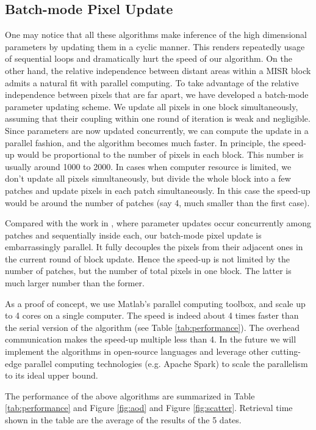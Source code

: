 \subsection{Batch-mode Pixel Update}
One may notice that all these algorithms make inference of the high dimensional parameters by updating them in a cyclic manner. This renders repeatedly usage of sequential loops and dramatically hurt the speed of our algorithm. On the other hand, the relative independence between distant areas within a MISR block admits a natural fit with parallel computing. To take advantage of the relative independence between pixels that are far apart, we have developed a batch-mode parameter updating scheme. We update all pixels in one block simultaneously, assuming that their coupling within one round of iteration is weak and negligible. Since parameters are now updated concurrently, we can compute the update in a parallel fashion, and the algorithm becomes much faster. In principle, the speed-up would be proportional to the number of pixels in each block. This number is usually around 1000 to 2000. In cases when computer resource is limited, we don't update all pixels simultaneously, but divide the whole block into a few patches and update pixels in each patch simultaneously. In this case the speed-up would be around the number of patches (say 4, much smaller than the first case).

Compared with the work in \cite{nancy_paper}, where parameter updates occur concurrently among patches and sequentially inside each, our batch-mode pixel update is embarrassingly parallel. It fully decouples the pixels from their adjacent ones in the current round of block update. Hence the speed-up is not limited by the number of patches, but the number of total pixels in one block. The latter is much larger number than the former.

As a proof of concept, we use Matlab's parallel computing toolbox, and scale up to 4 cores on a single computer. The speed is indeed about 4 times faster than the serial version of the algorithm (see Table \ref{tab:performance}). The overhead communication makes the speed-up multiple less than 4. In the future we will implement the algorithms in open-source languages and leverage other cutting-edge parallel computing technologies (e.g. Apache Spark) to scale the parallelism to its ideal upper bound.

The performance of the above algorithms are summarized in Table \ref{tab:performance} and Figure \ref{fig:aod} and Figure \ref{fig:scatter}. Retrieval time shown in the table are the average of the results of the 5 dates.

